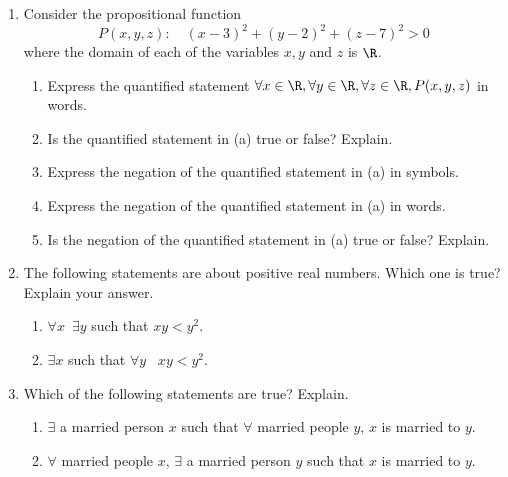 \begin{enumerate}
  
	\item Consider the propositional function
  \[P(x,y,z):\quad (x-3)^2+(y-2)^2+(z-7)^2>0\]
  where the domain of each of the variables $x,y$ and $z$ is $\R$.\prelistskip
  \begin{enumerate}
    \item Express the quantified statement $\forall x\in\R,\forall y\in\R,\forall z\in\R, P(x,y,z)$ in words.
    \item Is the quantified statement in (a) true or false? Explain.
    \item Express the negation of the quantified statement in (a) in symbols.
    \item Express the negation of the quantified statement in (a) in words.
    \item Is the negation of the quantified statement in (a) true or false? Explain.
  \end{enumerate}
  
	\item The following statements are about positive real numbers. Which one is true? Explain your answer.\prelistskip
	\begin{enumerate}
	  \item $\forall x$\, $\exists y$ such that $xy<y^2$.
	  \item $\exists x$ such that $\forall y$ \, $xy<y^2$.
	\end{enumerate}

	\item Which of the following statements are true? Explain.\prelistskip
	\begin{enumerate}
	  \item $\exists$ a married person $x$ such that $\forall$ married people $y$, $x$ is married to $y$.
	  \item $\forall$ married people $x$, $\exists$ a married person $y$ such that $x$ is married to $y$.
	\end{enumerate}
	
	

\end{enumerate}
